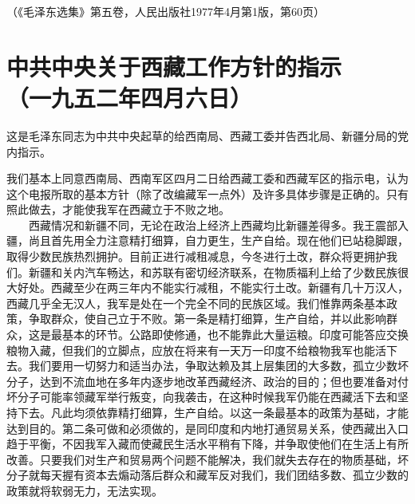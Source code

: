 \documentclass[cn,11pt,chinese]{elegantbook}
\def\myformat#1{\hfil\hfil #1}
\begin{document}
\begin{flushright}（《毛泽东选集》第五卷，人民出版社1977年4月第1版，第60页）\end{flushright}
\newpage\section*{\myformat{中共中央关于西藏工作方针的指示}\\\myformat{（一九五二年四月六日）}}
\begin{introduction}\item  这是毛泽东同志为中共中央起草的给西南局、西藏工委并告西北局、新疆分局的党内指示。\end{introduction}
我们基本上同意西南局、西南军区四月二日给西藏工委和西藏军区的指示电，认为这个电报所取的基本方针（除了改编藏军一点外）及许多具体步骤是正确的。只有照此做去，才能使我军在西藏立于不败之地。\\
　　西藏情况和新疆不同，无论在政治上经济上西藏均比新疆差得多。我王震部入疆，尚且首先用全力注意精打细算，自力更生，生产自给。现在他们已站稳脚跟，取得少数民族热烈拥护。目前正进行减租减息，今冬进行土改，群众将更拥护我们。新疆和关内汽车畅达，和苏联有密切经济联系，在物质福利上给了少数民族很大好处。西藏至少在两三年内不能实行减租，不能实行土改。新疆有几十万汉人，西藏几乎全无汉人，我军是处在一个完全不同的民族区域。我们惟靠两条基本政策，争取群众，使自己立于不败。第一条是精打细算，生产自给，并以此影响群众，这是最基本的环节。公路即使修通，也不能靠此大量运粮。印度可能答应交换粮物入藏，但我们的立脚点，应放在将来有一天万一印度不给粮物我军也能活下去。我们要用一切努力和适当办法，争取达赖及其上层集团的大多数，孤立少数坏分子，达到不流血地在多年内逐步地改革西藏经济、政治的目的；但也要准备对付坏分子可能率领藏军举行叛变，向我袭击，在这种时候我军仍能在西藏活下去和坚持下去。凡此均须依靠精打细算，生产自给。以这一条最基本的政策为基础，才能达到目的。第二条可做和必须做的，是同印度和内地打通贸易关系，使西藏出入口趋于平衡，不因我军入藏而使藏民生活水平稍有下降，并争取使他们在生活上有所改善。只要我们对生产和贸易两个问题不能解决，我们就失去存在的物质基础，坏分子就每天握有资本去煽动落后群众和藏军反对我们，我们团结多数、孤立少数的政策就将软弱无力，无法实现。\\
\end{document}
